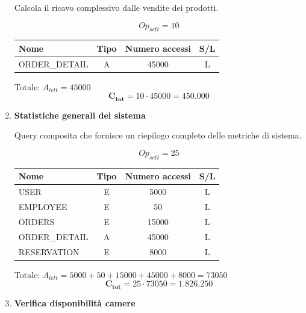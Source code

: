 \documentclass[a4paper,12pt]{report}
\begin{document}
\begin{enumerate}
    Calcola il ricavo complessivo dalle vendite dei prodotti.
    
    $$Op_{sett} = 10$$
    
    \begin{table}[H]
        \centering
        \small
        \renewcommand{\arraystretch}{1.15}
        \begin{tabularx}{0.9\textwidth}{|X|c|c|c|}
            \hline
            \rowcolor{gray!20}
            \textbf{Nome} & \textbf{Tipo} & \textbf{Numero accessi} & \textbf{S/L} \\
            \hline
            ORDER\_DETAIL & A & 45000 & L \\
            \hline
        \end{tabularx}
    \end{table}
    
    Totale: $A_{lett} = 45000$
    $$\mathbf{C_{tot}} = 10 \cdot 45000 = \mathbf{450.000}$$

    \item {\large \textbf{Statistiche generali del sistema}} \label{op6}
    
    Query composita che fornisce un riepilogo completo delle metriche di sistema.
    
    $$Op_{sett} = 25$$
    
    \begin{table}[H]
        \centering
        \small
        \renewcommand{\arraystretch}{1.15}
        \begin{tabularx}{0.9\textwidth}{|X|c|c|c|}
            \hline
            \rowcolor{gray!20}
            \textbf{Nome} & \textbf{Tipo} & \textbf{Numero accessi} & \textbf{S/L} \\
            \hline
            USER & E & 5000 & L \\
            EMPLOYEE & E & 50 & L \\
            ORDERS & E & 15000 & L \\
            ORDER\_DETAIL & A & 45000 & L \\
            RESERVATION & E & 8000 & L \\
            \hline
        \end{tabularx}
    \end{table}
    
    Totale: $A_{lett} = 5000 + 50 + 15000 + 45000 + 8000 = 73050$
    $$\mathbf{C_{tot}} = 25 \cdot 73050 = \mathbf{1.826.250}$$

    \item {\large \textbf{Verifica disponibilità camere}} \label{op7}
    

\end{enumerate}
\end{document}
